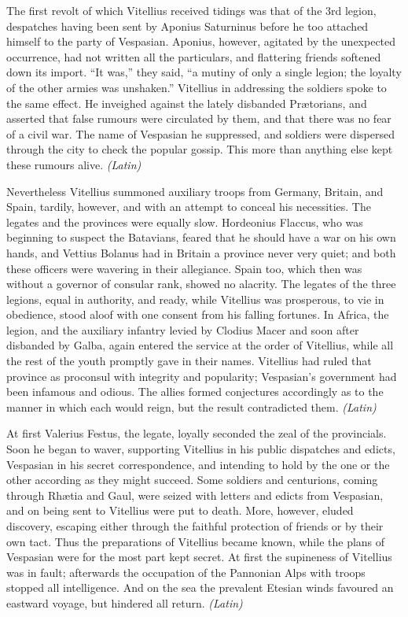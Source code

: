 
The first revolt of which Vitellius received tidings was that of the 3rd legion, despatches having been sent by Aponius Saturninus before he too attached himself to the party of Vespasian. Aponius, however, agitated by the unexpected occurrence, had not written all the particulars, and flattering friends softened down its import. ``It was,'' they said, ``a mutiny of only a single legion; the loyalty of the other armies was unshaken.'' Vitellius in addressing the soldiers spoke to the same effect. He inveighed against the lately disbanded Prætorians, and asserted that false rumours were circulated by them, and that there was no fear of a civil war. The name of Vespasian he suppressed, and soldiers were dispersed through the city to check the popular gossip. This more than anything else kept these rumours alive. \emph{(Latin)}


Nevertheless Vitellius summoned auxiliary troops from Germany, Britain, and Spain, tardily, however, and with an attempt to conceal his necessities. The legates and the provinces were equally slow. Hordeonius Flaccus, who was beginning to suspect the Batavians, feared that he should have a war on his own hands, and Vettius Bolanus had in Britain a province never very quiet; and both these officers were wavering in their allegiance. Spain too, which then was without a governor of consular rank, showed no alacrity. The legates of the three legions, equal in authority, and ready, while Vitellius was prosperous, to vie in obedience, stood aloof with one consent from his falling fortunes. In Africa, the legion, and the auxiliary infantry levied by Clodius Macer and soon after disbanded by Galba, again entered the service at the order of Vitellius, while all the rest of the youth promptly gave in their names. Vitellius had ruled that province as proconsul with integrity and popularity; Vespasian's government had been infamous and odious. The allies formed conjectures accordingly as to the manner in which each would reign, but the result contradicted them. \emph{(Latin)}


At first Valerius Festus, the legate, loyally seconded the zeal of the provincials. Soon he began to waver, supporting Vitellius in his public dispatches and edicts, Vespasian in his secret correspondence, and intending to hold by the one or the other according as they might succeed. Some soldiers and centurions, coming through Rhætia and Gaul, were seized with letters and edicts from Vespasian, and on being sent to Vitellius were put to death. More, however, eluded discovery, escaping either through the faithful protection of friends or by their own tact. Thus the preparations of Vitellius became known, while the plans of Vespasian were for the most part kept secret. At first the supineness of Vitellius was in fault; afterwards the occupation of the Pannonian Alps with troops stopped all intelligence. And on the sea the prevalent Etesian winds favoured an eastward voyage, but hindered all return. \emph{(Latin)}

